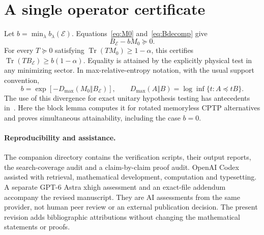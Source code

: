 \documentclass[11pt,a4paper]{article}
\theoremstyle{remark}\newtheorem{remark}[theorem]{Remark}
\DeclareMathOperator{\Tr}{Tr}
\newcommand{\cE}{\mathcal E}
\begin{document}
\section{A single operator certificate}
Let $b=\min_\lambda b_\lambda(\cE)$. Equations~\eqref{eq:M0} and~\eqref{eq:Bdecomp} give
\begin{equation}
 B_{\cE}-bM_0\succeq0.
\end{equation}
For every $T\succeq0$ satisfying $\Tr(TM_0)\geq1-\alpha$, this certifies
\(\Tr(TB_{\cE})\geq b(1-\alpha)\).
Equality is attained by the explicitly physical test in any minimizing sector. In max-relative-entropy notation, with the usual support convention,
\begin{equation}
 b=\exp[-D_{\max}(M_0\Vert B_{\cE})],\qquad
 D_{\max}(A\Vert B)=\log\inf\{t:A\preceq tB\}.
\end{equation}
The use of this divergence for exact unitary hypothesis testing has antecedents in~\cite{chen_symmetry,hayashi_symmetry}. Here the block lemma computes it for rotated memoryless CPTP alternatives and proves simultaneous attainability, including the case $b=0$.

\paragraph{Reproducibility and assistance.}
The companion directory contains the verification scripts, their output reports, the search-coverage audit and a claim-by-claim proof audit. OpenAI Codex assisted with retrieval, mathematical development, computation and typesetting. A separate GPT-6 Astra xhigh assessment and an exact-file addendum accompany the revised manuscript. They are AI assessments from the same provider, not human peer review or an external publication decision. The present revision adds bibliographic attributions without changing the mathematical statements or proofs.
\end{document}
